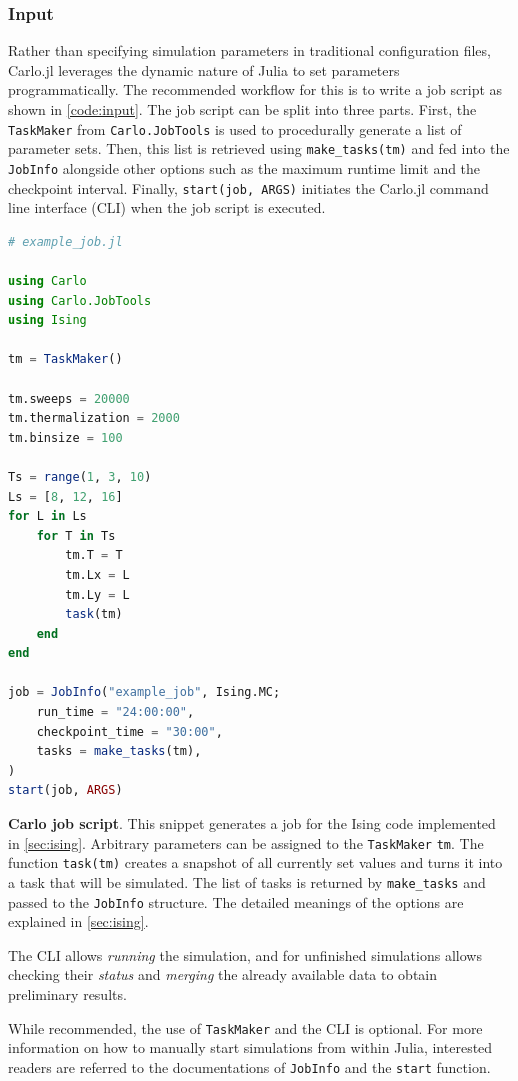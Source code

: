 \documentclass{SciPost}
\begin{document}
\subsubsection{Input}
Rather than specifying simulation parameters in traditional configuration files, Carlo.jl leverages the dynamic nature of Julia to set parameters programmatically. The recommended workflow for this is to write a job script as shown in \cref{code:input}. The job script can be split into three parts. First, the \texttt{TaskMaker} from \texttt{Carlo.JobTools} is used to procedurally generate a list of parameter sets. Then, this list is retrieved using \texttt{make\_{}tasks(tm)} and fed into the \texttt{JobInfo} alongside other options such as the maximum runtime limit and the checkpoint interval. Finally, \texttt{start(job, ARGS)} initiates the Carlo.jl command line interface (CLI) when the job script is executed.
\begin{lstfloat}
\begin{lstlisting}[language=julia]
# example_job.jl

using Carlo
using Carlo.JobTools
using Ising

tm = TaskMaker()

tm.sweeps = 20000
tm.thermalization = 2000
tm.binsize = 100

Ts = range(1, 3, 10)
Ls = [8, 12, 16]
for L in Ls
    for T in Ts
        tm.T = T
        tm.Lx = L
        tm.Ly = L
        task(tm)
    end
end

job = JobInfo("example_job", Ising.MC;
    run_time = "24:00:00",
    checkpoint_time = "30:00",
    tasks = make_tasks(tm),
)
start(job, ARGS)
\end{lstlisting}
\caption{\textbf{Carlo job script}. This snippet generates a job for the Ising code implemented in \cref{sec:ising}. Arbitrary parameters can be assigned to the \texttt{TaskMaker} \texttt{tm}. The function \texttt{task(tm)} creates a snapshot of all currently set values and turns it into a task that will be simulated. The list of tasks is returned by \texttt{make\_{}tasks} and passed to the \texttt{JobInfo} structure. The detailed meanings of the options are explained in \cref{sec:ising}.}
\label{code:input}
\end{lstfloat}
The CLI allows \textit{running} the simulation, and for unfinished simulations allows checking their \textit{status} and \textit{merging} the already available data to obtain preliminary results. 

While recommended, the use of \texttt{TaskMaker} and the CLI is optional. For more information on how to manually start simulations from within Julia, interested readers are referred to the documentations of \texttt{JobInfo} and the \texttt{start} function.
\end{document}

